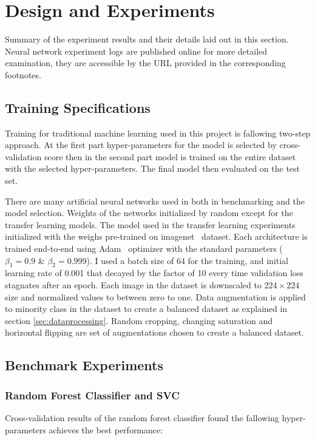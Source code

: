 \chapter{Design and Experiments}
Summary of the experiment results and their details laid out in this section.
Neural network experiment logs are published online for more detailed examination, they are accessible by the URL provided in the corresponding footnotes.

\section{Training Specifications}
Training for traditional machine learning used in this project is fallowing two-step approach.
At the first part hyper-parameters for the model is selected by cross-validation score then in the second part model is trained on the entire dataset with the selected hyper-parameters.
The final model then evaluated on the test set.

There are many artificial neural networks used in both in benchmarking and the model selection.
Weights of the networks initialized by random except for the transfer learning models.
The model used in the transfer learning experiments initialized with the weighs pre-trained on imagenet~\cite{imagenet} dataset.
Each architecture is trained end-to-end using Adam~\cite{adam} optimizer with the standard parameters ($\beta_1 = 0.9$ \& $\beta_2 = 0.999$).
I used a batch size of 64 for the training, and initial learning rate of 0.001 that decayed by the factor of 10 every time validation loss stagnates after an epoch.
Each image in the dataset is downscaled to $224 \times 224$ size and normalized values to between zero to one.
Data augmentation is applied to minority class in the dataset to create a balanced dataset as explained in section \ref{sec:dataprocessing}.
Random cropping, changing saturation and horizontal flipping are set of augmentations chosen to create a balanced dataset.


\section{Benchmark Experiments}

\subsection{Random Forest Classifier and SVC}
Cross-validation results of the random forest classifier found the fallowing hyper-parameters achieves the best performance:

